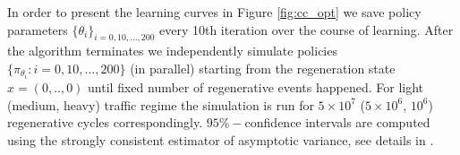 \documentclass[11pt]{article}
\theoremstyle{definition}
\numberwithin{equation}{section}
\begin{document}
In order to present the learning curves in Figure \ref{fig:cc_opt}  we  save policy parameters $\{\theta_i\}_{i=0, 10, ..., 200}$ every 10th iteration over the course of learning. After the algorithm terminates we independently
 simulate   policies $\{    \pi_{\theta_i}: i = 0, 10, ..., 200 \}$ (in parallel) starting from the regeneration state $x = (0,..,0)$ until fixed number of regenerative events happened. For light (medium, heavy)  traffic regime the simulation is run for $5\times10^7$ ($5\times 10^6$, $10^6$) regenerative cycles correspondingly.
  $95\%-$confidence intervals   are computed using the strongly consistent estimator of asymptotic variance, see details in \cite[Section VI.2d]{Asmussen2003}.


  \begin{figure}[H]
     \\
\end{figure}
\end{document}
